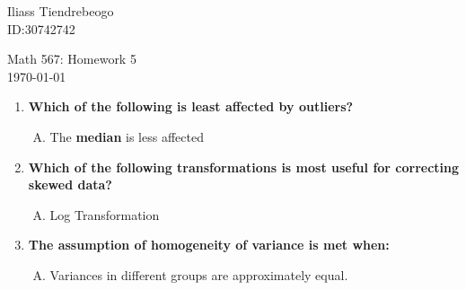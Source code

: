 \documentclass{article}[16pt]
\begin{document}
\hfill Iliass Tiendrebeogo\\

\hfill ID:30742742\\

\bigskip

\begin{center}
  \begin{Large}
    Math 567: Homework 5 \\
     {\small \today}
   
  \end{Large}
\end{center} 


\begin{enumerate}[1.]
\item  %
{\bf Which of the following is least affected by outliers? }
 \begin{enumerate}[C.]
 \item 
The {\bf median} is less affected 
\end{enumerate}
\item %
{\bf Which of the following transformations is most useful for correcting skewed data?}
 \begin{enumerate}[A.]
 \item 
  Log Transformation
  \end{enumerate}

\item %
{\bf The assumption of homogeneity of variance is met when:}
 \begin{enumerate}[B.]
 \item 
Variances in different groups are approximately equal.
  \end{enumerate}
  
  

\end{enumerate}
\end{document}
